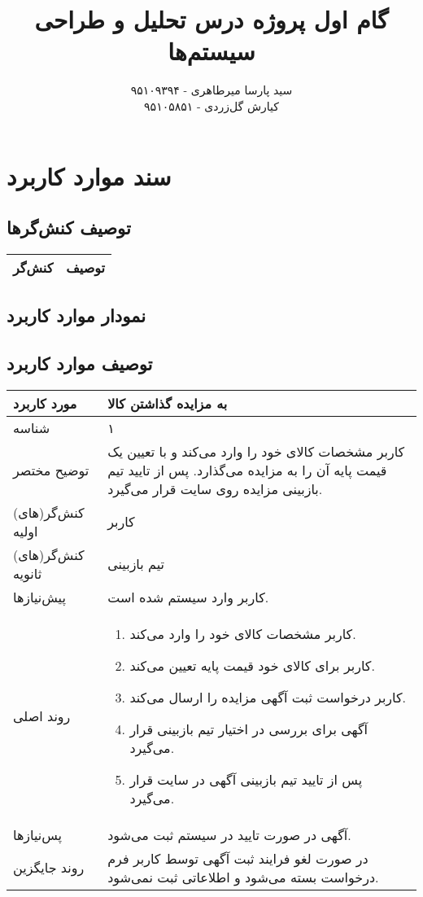 \documentclass{article}
\title{\textbf{گام اول پروژه درس تحلیل و طراحی سیستم‌ها}}
\author{سید پارسا میرطاهری - ۹۵۱۰۹۳۹۴ \\ کیارش گل‌زردی - ۹۵۱۰۵۸۵۱}
\begin{document}
\date{}

\maketitle

\section{سند موارد کاربرد}

\subsection{توصیف کنش‌گرها}

\begin{center}
\begin{tabular} {|c|c|}
\hline
کنش‌گر & توصیف \\
\hline	
\end{tabular}	
\end{center}

\subsection{نمودار موارد کاربرد}

\subsection{توصیف موارد کاربرد}

\begin{center}
\bgroup
\def\arraystretch{1.5}
\begin{tabular} {|p{}|p{}|}
\hline
 مورد کاربرد & 
 به مزایده گذاشتن کالا
\\ \hline
 شناسه &
۱
\\ \hline
توضیح مختصر &
کاربر مشخصات کالای خود را وارد می‌کند و با تعیین یک قیمت پایه آن را به مزایده می‌گذارد.
پس از تایید تیم بازبینی مزایده روی سایت قرار می‌گیرد.
\\ \hline
کنش‌گر(های) اولیه &
کاربر
\\ \hline
کنش‌گر(های) ثانویه &
تیم بازبینی
\\ \hline
پیش‌نیازها &
کاربر وارد سیستم شده است.
\\ \hline
روند اصلی &
\begin{enumerate}[nosep,topsep=0cm]
\item
کاربر مشخصات کالای خود را وارد می‌کند.
\item
کاربر برای کالای خود قیمت پایه تعیین می‌کند.
\item
کاربر درخواست ثبت آگهی مزایده را ارسال می‌کند.
\item
آگهی برای بررسی در اختیار تیم بازبینی قرار می‌گیرد.
\item
پس از تایید تیم بازبینی آگهی در سایت قرار می‌گیرد.
\end{enumerate}
\\ \hline
پس‌نیازها &
آگهی در صورت تایید در سیستم ثبت می‌شود.
\\ \hline
روند جایگزین &
در صورت لغو فرایند ثبت آگهی توسط کاربر فرم درخواست بسته می‌شود و اطلاعاتی ثبت نمی‌شود.
\\ \hline
\end{tabular}
\egroup
\end{center}
\end{document}
